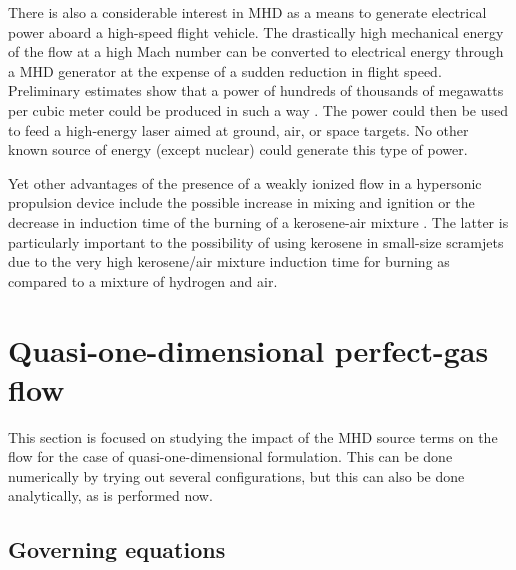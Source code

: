 \documentclass{warpdoc}
\begin{document}
There is also
a considerable interest in MHD as a means to generate electrical
power aboard a high-speed flight vehicle. The drastically high mechanical
energy of the flow at a high Mach number can be converted to electrical energy
through a MHD generator at the expense of a sudden reduction in flight speed.
Preliminary estimates show that a power
of hundreds of thousands of megawatts per cubic meter could be produced in such a way
\cite{aiaaconf:2002:thibodeaux}. The power
could then be used to feed a high-energy laser aimed at ground, air, or space targets. No
other known source of energy (except nuclear) could generate this type of power.

Yet other advantages of the presence of a weakly ionized flow in a hypersonic propulsion
device include the possible increase in mixing and ignition \cite{aiaaconf:2002:bocharov}
or the decrease in induction time of the burning
of a kerosene-air mixture \cite{aiaaconf:2002:klimov}. The latter is
particularly important to the possibility of using kerosene in small-size scramjets due
to the very high kerosene/air mixture induction time for burning as compared to a mixture
of hydrogen and air.





\section{Quasi-one-dimensional perfect-gas flow}

This section is focused on studying the impact of the MHD source terms on the flow for the case
of quasi-one-dimensional formulation. This can be done numerically by trying out several
configurations, but this can also be done analytically, as is performed now.

\subsection{Governing equations}
\end{document}

